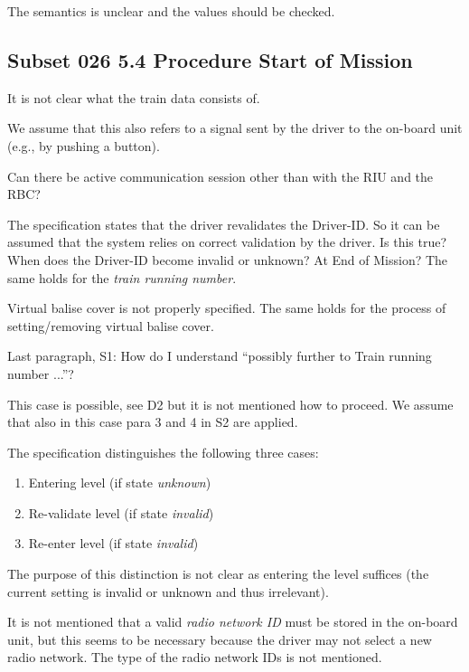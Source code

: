 \documentclass{template/openetcs_article}
\begin{document}
\resolution The semantics is unclear and the values should be checked.


\subsection{Subset 026 5.4 Procedure Start of Mission}

It is not clear what the train data consists of.

 We assume that this also refers to a signal sent by the driver to the on-board unit (e.g., by pushing a button).

Can there be active communication session other than with the RIU and the RBC?

The specification states that the driver revalidates the Driver-ID. So it can be assumed that the system relies on correct validation by the driver. Is this true? When does the Driver-ID become invalid or unknown? At End of Mission? The same holds for the \emph{train running number}.

Virtual balise cover is not properly specified. The same holds for the process of setting/removing virtual balise cover.

Last paragraph, S1: How do I understand ``possibly further to Train running number ...''?

This case is possible, see D2 but it is not mentioned how to proceed. We assume that also in this case para 3 and 4 in S2 are applied.

The specification distinguishes the following three cases:
\begin{enumerate}
   \item Entering level (if state \emph{unknown})
   \item Re-validate level (if state \emph{invalid})
   \item Re-enter level (if state \emph{invalid})
\end{enumerate}
The purpose of this distinction is not clear as entering the level suffices (the current setting is invalid or unknown and thus irrelevant).

It is not mentioned that a valid \emph{radio network ID} must be stored in the on-board unit, but this seems to be necessary because the driver may not select a new radio network. The type of the radio network IDs is not mentioned.
\end{document}
